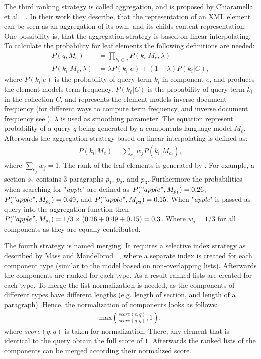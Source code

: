 The third ranking strategy is called aggregation, and is proposed by Chiaramella et al. ~\cite{Yv96}. In their work they describe, that the representation of an XML element can be seen as an aggregation of its own, and its childs content representation. One possibility is, that the aggregation strategy is based on linear interpolating. To calculate the probability for leaf elements the following definitions are needed:
\begin{align}
  \label{prob_query_lan_model}
  P(q, M_e) & = \prod_{k_i \in q} P(k_i|M_e, \lambda) \\
  P(k_i|M_e, \lambda) & = \lambda P(k_i|e) + (1 - \lambda) P(k_i|C),
\end{align}
where $P(k_i|e)$ is the probability of query term $k_i$ in component $e$, and produces the element models term frequency. $P(k_i|C)$ is the probability of query term $k_i$ in the collection $C$, and represents the element models inverse document frequency (for different ways to compute term frequency, and inverse document frequency see ). $\lambda$ is used as smoothing parameter. The equation represent probability of a query $q$ being generated by a components language model $M_e$. Afterwards the aggregation strategy based on linear interpolating is defined as:
\begin{align}
  P(k_i|M_e) = \sum_{e_j} w_j P(k_i|M_{e_{j}}),
\end{align}
where $\sum_{e_j} w_j = 1$. The rank of the leaf elements is generated by . For example, a section $s_1$ contains $3$ paragraphs $p_1$, $p_2$, and $p_3$. Furthermore the probabilities when searching for "\textit{apple}" are defined as $P("apple", M_{p_1}) = 0.26$, $P("apple", M_{p_2}) = 0.49$, and $P("apple", M_{p_3}) = 0.15$. When "\textit{apple}" is passed as query into the aggregation function then $P("apple", M_{s_1}) = 1/3 \times (0.26 + 0.49 + 0.15) = 0.3$. Where $w_j = 1/3$ for all components as they are equally contributed.

The fourth strategy is named merging. It requires a selective index strategy as described by Mass and Mandelbrod ~\cite{MassM04}, where a separate index is created for each component type (similar to the model based on non-overlapping lists). Afterwards the components are ranked for each type. As a result ranked lists are created for each type. To merge the list normalization is needed, as the components of different types have different lengths (e.g. length of section, and length of a paragraph). Hence, the normalization of components looks as follows:
\begin{align}
  \text{max}\left( \frac{\mathit{score}(e, q)}{\mathit{score}(q, q)}, 1 \right),
\end{align}
where $\mathit{score}(q, q)$ is taken for normalization. There, any element that is identical to the query obtain the full score of $1$. Afterwards the ranked lists of the components can be merged according their normalized score.


